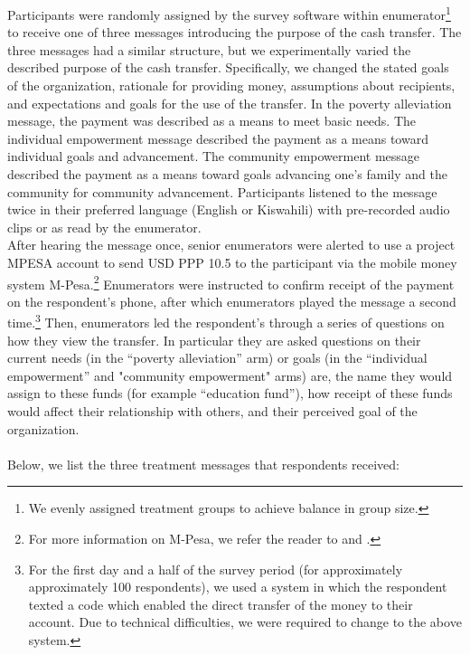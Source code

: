 \documentclass[11pt, a4paper]{article}\usepackage[]{graphicx}\usepackage[]{color}
\begin{document}
        Participants were randomly assigned by the survey software within enumerator\footnote{We evenly assigned treatment groups to achieve balance in group size.} to receive one of three messages introducing the purpose of the cash transfer. The three messages had a similar structure, but we experimentally varied the described purpose of the cash transfer. Specifically, we changed the stated goals of the organization, rationale for providing money, assumptions about recipients, and expectations and goals for the use of the transfer. In the poverty alleviation message, the payment was described as a means to meet basic needs. The individual empowerment message described the payment as a means toward individual goals and advancement. The community empowerment message described the payment as a means toward goals advancing one's family and the community for community advancement. Participants listened to the message twice in their preferred language (English or Kiswahili) with pre-recorded audio clips or as read by the enumerator. \\

        After hearing the message once, senior enumerators were alerted to use a project MPESA account to send USD PPP 10.5 to the participant via the mobile money system M-Pesa.\footnote{For more information on M-Pesa, we refer the reader to \textcite{jack_mobile_2011} and \textcite{mbiti_mobile_2011}.} Enumerators were instructed to confirm receipt of the payment on the respondent's phone, after which enumerators played the message a second time.\footnote{For the first day and a half of the survey period (for approximately approximately 100 respondents), we used a system in which the respondent texted a code which enabled the direct transfer of the money to their account. Due to technical difficulties, we were required to change to the above system.} Then, enumerators led the respondent's through a series of questions on how they view the transfer. In particular they are asked questions on their current needs (in the ``poverty alleviation'' arm) or goals (in the ``individual empowerment'' and "community empowerment" arms) are, the name they would assign to these funds (for example ``education fund''), how receipt of these funds would affect their relationship with others, and their perceived goal of the organization. \\

         \\
        
        Below, we list the three treatment messages that respondents received: \\
\end{document}
